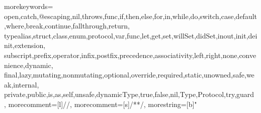 {
  morekeywords={
    open,catch,@escaping,nil,throws,func,if,then,else,for,in,while,do,switch,case,default,where,break,continue,fallthrough,return,
    typealias,struct,class,enum,protocol,var,func,let,get,set,willSet,didSet,inout,init,deinit,extension,
    subscript,prefix,operator,infix,postfix,precedence,associativity,left,right,none,convenience,dynamic,
    final,lazy,mutating,nonmutating,optional,override,required,static,unowned,safe,weak,internal,
    private,public,is,as,self,unsafe,dynamicType,true,false,nil,Type,Protocol,try,guard
  },
  morecomment=[l]{//}, %
  morecomment=[s]{/*}{*/}, %
  morestring=[b]" %
}